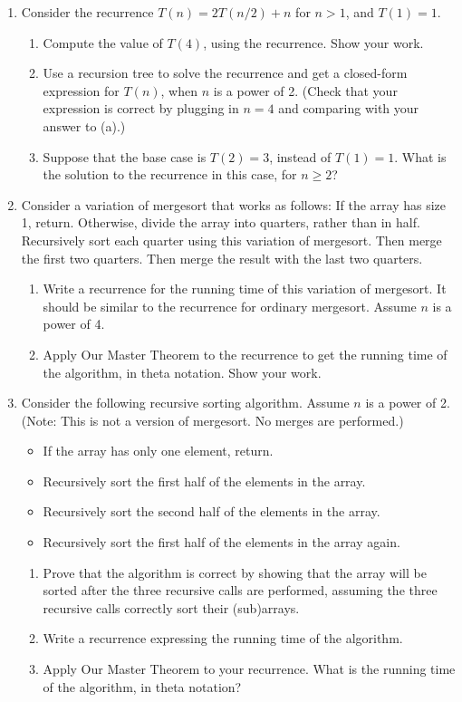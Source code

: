 \documentclass{article}
\begin{document}
\begin{enumerate}
    \item Consider the recurrence $T(n) = 2T(n/2) + n$ for $n > 1$, and $T(1) = 1$.
    \begin{enumerate}
        \item Compute the value of $T(4)$, using the recurrence. Show your work.
        \item Use a recursion tree to solve the recurrence and get a closed-form expression for $T(n)$, when $n$ is a power of 2. (Check that your expression is correct by plugging in $n = 4$ and comparing with your answer to (a).)
        \item Suppose that the base case is $T(2) = 3$, instead of $T(1) = 1$. What is the solution to the recurrence in this case, for $n \ge 2$?
    \end{enumerate}

    \item Consider a variation of mergesort that works as follows: If the array has size 1, return. Otherwise, divide the array into quarters, rather than in half. Recursively sort each quarter using this variation of mergesort. Then merge the first two quarters. Then merge the result with the last two quarters.
    \begin{enumerate}
        \item Write a recurrence for the running time of this variation of mergesort. It should be similar to the recurrence for ordinary mergesort. Assume $n$ is a power of 4.
        \item Apply Our Master Theorem to the recurrence to get the running time of the algorithm, in theta notation. Show your work.
    \end{enumerate}

    \item Consider the following recursive sorting algorithm. Assume $n$ is a power of 2. (Note: This is not a version of mergesort. No merges are performed.)
    \begin{itemize}
        \item If the array has only one element, return.
        \item Recursively sort the first half of the elements in the array.
        \item Recursively sort the second half of the elements in the array.
        \item Recursively sort the first half of the elements in the array again.
    \end{itemize}
    \begin{enumerate}
        \item Prove that the algorithm is correct by showing that the array will be sorted after the three recursive calls are performed, assuming the three recursive calls correctly sort their (sub)arrays.
        \item Write a recurrence expressing the running time of the algorithm.
        \item Apply Our Master Theorem to your recurrence. What is the running time of the algorithm, in theta notation?
    \end{enumerate}


\end{enumerate}
\end{document}
